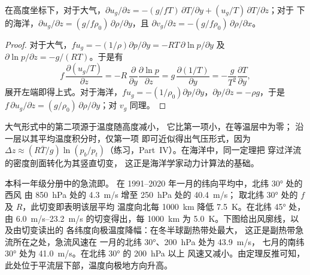 \begin{corollary}[高度坐标下的热成风]\label{cor:b3:gfd-foundations:thermal-wind-z}
在高度坐标下，对于大气，$\partial u_g/\partial z =
-(g/fT)\,\partial T/\partial y + (u_g/T)\,\partial T/\partial z$；对于
下的海洋，$\partial u_g/\partial z =
(g/f\rho_0)\,\partial\rho/\partial y$，且 $\partial v_g/\partial z =
-(g/f\rho_0)\,\partial\rho/\partial x$。
\end{corollary}

\begin{proof}
对于大气，$fu_g = -(1/\rho)\partial p/\partial y = -RT\,\partial\ln
p/\partial y$ 及 $\partial\ln p/\partial z = -g/(RT)$。于是有
\[
f\,\frac{\partial(u_g/T)}{\partial z} = -R\,\frac{\partial}{\partial y}\frac{\partial\ln p}{\partial z}
= g\,\frac{\partial(1/T)}{\partial y} = -\frac{g}{T^2}\frac{\partial T}{\partial y} ,
\]
展开左端即得上式。对于海洋，$fu_g = -(1/\rho_0)\partial
p/\partial y$，$\partial p/\partial z = -\rho g$，于是 $f\,\partial u_g/
\partial z = (g/\rho_0)\,\partial\rho/\partial y$；对 $v_g$ 同理。
\end{proof}

大气形式中的第二项源于温度随高度减小，
它比第一项小，在等温层中为零；
沿一层以其平均温度积分时，仅第一项
即可近似得出气压形式，因为 $\Delta z \approx (R\bar T/g)
\ln(p_b/p_t)$（练习，Part~IV）。在海洋中，同一定理把
穿过洋流的密度剖面转化为其竖直切变，
这正是海洋学家动力计算法的基础。


本科一年级分册中的急流即。
在 1991--2020 年一月的纬向平均中，北纬 \ang{30} 处的西风
由 \qty{850}{hPa} 处的 \qty{4.3}{m/s} 增至 \qty{250}{hPa} 处的 \qty{40.4}{m/s}；
取北纬 \ang{30} 处的 $f$ 及 $R$，此切变即表明该层平均
温度向北每 \qty{1000}{km} 降低 \qty{7.5}{K}。在北纬 \ang{45}
处，由 \qtyrange{6.0}{23.2}{m/s} 的切变得出，每
\qty{1000}{km} 为 \qty{5.0}{K}。下图给出风廓线，以及由切变读出的
各纬度向极温度降幅：在冬半球副热带处最大，
这正是副热带急流所在之处，急流风速在
一月的北纬 \ang{30}、\qty{200}{hPa} 处为 \qty{43.9}{m/s}，
七月的南纬 \ang{30} 处为 \qty{41.0}{m/s}。在北纬 \ang{30} 的 \qty{200}{hPa} 以上
风速又减小。由定理反推可知，
此处位于平流层下部，温度向极地方向升高。

